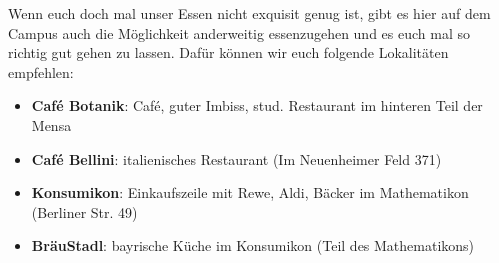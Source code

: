   Wenn euch doch mal unser Essen nicht exquisit genug ist, gibt es hier auf dem Campus auch die Möglichkeit
  anderweitig essenzugehen und es euch mal so richtig gut gehen zu lassen. Dafür können wir euch
  folgende Lokalitäten empfehlen:
  \begin{itemize}
  \item \textbf{Café Botanik}: Café, guter Imbiss, stud. Restaurant im hinteren Teil der Mensa
  \item \textbf{Café Bellini}: italienisches Restaurant (Im Neuenheimer Feld 371)
  \item \textbf{Konsumikon}: Einkaufszeile mit Rewe, Aldi, Bäcker im Mathematikon (Berliner Str. 49)
  \item \textbf{BräuStadl}: bayrische Küche im Konsumikon (Teil des Mathematikons)
  \end{itemize}
